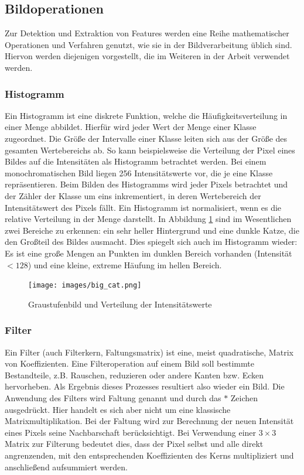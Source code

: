 \subsection{Bildoperationen}

Zur Detektion und Extraktion von Features werden eine Reihe mathematischer Operationen und Verfahren genutzt, wie sie in der Bildverarbeitung üblich sind. Hiervon werden diejenigen vorgestellt, die im Weiteren in der Arbeit verwendet werden.

\subsubsection{Histogramm}

Ein Histogramm ist eine diskrete Funktion, welche die Häufigkeitsverteilung in einer Menge abbildet. Hierfür wird jeder Wert der Menge einer Klasse zugeordnet. Die Größe der Intervalle einer Klasse leiten sich aus der Größe des gesamten Wertebereichs ab. So kann beispielsweise die Verteilung der Pixel eines Bildes auf die Intensitäten als Histogramm betrachtet werden. Bei einem monochromatischen Bild liegen 256 Intensitätswerte vor, die je eine Klasse repräsentieren. Beim Bilden des Histogramms wird jeder Pixels betrachtet und der Zähler der Klasse um eins inkrementiert, in deren Wertebereich der Intensitätswert des Pixels fällt. Ein Histogramm ist normalisiert, wenn es die relative Verteilung in der Menge darstellt.
In Abbildung \ref{img:hist} sind im Wesentlichen zwei Bereiche zu erkennen: ein sehr heller Hintergrund und eine dunkle Katze, die den Großteil des Bildes ausmacht. Dies spiegelt sich auch im Histogramm wieder: Es ist eine große Mengen an Punkten im dunklen Bereich vorhanden (Intensität $< 128$) und eine kleine, extreme Häufung im hellen Bereich.

\begin{figure}
	\centering
	\texttt{[image: images/big\_cat.png]}
	\caption[cat]{Graustufenbild und Verteilung der Intensitätswerte \footnotemark}
	\label{img:hist}
\end{figure}


\subsubsection{Filter} 
Ein Filter (auch Filterkern, Faltungsmatrix) ist eine, meist quadratische, Matrix von Koeffizienten. Eine Filteroperation auf einem Bild soll bestimmte Bestandteile, z.B. Rauschen, reduzieren oder andere Kanten bzw. Ecken hervorheben. Als Ergebnis dieses Prozesses resultiert also wieder ein Bild. Die Anwendung des Filters wird Faltung genannt und durch das $*$ Zeichen ausgedrückt. Hier handelt es sich aber nicht um eine klassische Matrixmultiplikation. Bei der Faltung wird zur Berechnung der neuen Intensität eines Pixels seine Nachbarschaft berücksichtigt. Bei Verwendung einer $3 \times 3$ Matrix zur Filterung bedeutet dies, dass der Pixel selbst und alle direkt angrenzenden, mit den entsprechenden Koeffizienten des Kerns multipliziert und anschließend aufsummiert werden. 

